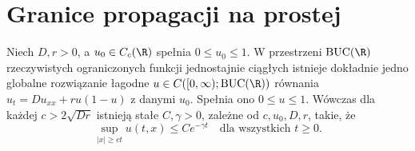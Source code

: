 \section{Granice propagacji na prostej}
\begin{twierdzenie}
\label{thm:pde27-spreading-upper}
Niech $D,r>0$, a $u_0\in C_c(\R)$ spełnia
$0\le u_0\le1$. W przestrzeni $\operatorname{BUC}(\R)$ rzeczywistych
ograniczonych funkcji jednostajnie ciągłych istnieje
dokładnie jedno globalne rozwiązanie łagodne
$u\in C([0,\infty);\operatorname{BUC}(\R))$
równania $u_t=Du_{xx}+ru(1-u)$ z danymi $u_0$.
Spełnia ono $0\le u\le1$.
Wówczas dla każdej $c>2\sqrt{Dr}$ istnieją
stałe $C,\gamma>0$, zależne od $c,u_0,D,r$, takie, że
\[
 \sup_{|x|\ge ct}u(t,x)\le C e^{-\gamma t}
 \quad\text{dla wszystkich }t\ge0.
\]
\end{twierdzenie}
